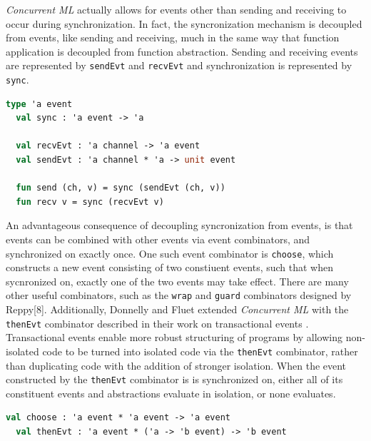 \documentclass{article}
\begin{document}
\textit{Concurrent ML} actually allows for events other than sending and receiving to
occur during synchronization. In fact, the syncronization mechanism is decoupled from
events, like sending and receiving, much in the same way that function application is decoupled
from function abstraction. Sending and receiving events are represented by \lstinline{sendEvt}
and \lstinline{recvEvt} and synchronization is represented by \lstinline{sync}.

\begin{lstlisting}[language=ML, escapechar=\%]
  type 'a event
  val sync : 'a event -> 'a

  val recvEvt : 'a channel -> 'a event
  val sendEvt : 'a channel * 'a -> unit event

  fun send (ch, v) = sync (sendEvt (ch, v))
  fun recv v = sync (recvEvt v)
  \end{lstlisting}

An advantageous consequence of decoupling syncronization from events, is that events can be
combined with other events via event combinators, and synchronized on exactly once. One such
event combinator is \lstinline{choose}, which constructs a new event consisting of two
constiuent events, such that when sycnronized on, exactly one of the two events may take
effect. There are many other useful combinators, such as the \lstinline{wrap} and
\lstinline{guard} combinators designed by Reppy[8]. Additionally, Donnelly and Fluet extended
\textit{Concurrent ML} with the \lstinline{thenEvt} combinator described in their work on
transactional events \cite{transactional_events}. Transactional events enable more robust
structuring of programs by allowing non-isolated code to be turned into isolated code via
the \lstinline{thenEvt} combinator, rather than duplicating code with the addition of stronger
isolation. When the event constructed by the \lstinline{thenEvt} combinator is is synchronized
on, either all of its constituent events and abstractions evaluate in isolation, or none
evaluates.

\begin{lstlisting}[language=ML, escapechar=\%]
  val choose : 'a event * 'a event -> 'a event
  val thenEvt : 'a event * ('a -> 'b event) -> 'b event
  \end{lstlisting}
\end{document}

